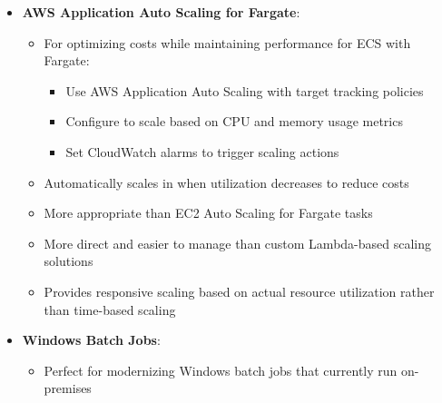 \documentclass[11pt,a4paper]{report}
\begin{document}
\begin{itemize}
\begin{itemize}
\begin{itemize}
\end{itemize}
  \item Provides serverless compute engine for containers that eliminates need to provision and manage servers
  \item Automatically scales application in response to changing demand without manual intervention
  \item Requires minimal code changes as containers can use the same images from on-premises environment
  \item Significantly reduces operational overhead compared to managing EC2 instances for container hosting
  \item More suitable than Lambda for containerized applications as it doesn't require application redesign
  \item Better than HPC solutions which are designed for compute-intensive workloads rather than web applications
  \item Creates a highly available, scalable architecture with minimal development effort and operational overhead
\end{itemize}
  \item \textbf{AWS Application Auto Scaling for Fargate}:
\begin{itemize}
  \item For optimizing costs while maintaining performance for ECS with Fargate:
\begin{itemize}
  \item Use AWS Application Auto Scaling with target tracking policies
  \item Configure to scale based on CPU and memory usage metrics
  \item Set CloudWatch alarms to trigger scaling actions
\end{itemize}
  \item Automatically scales in when utilization decreases to reduce costs
  \item More appropriate than EC2 Auto Scaling for Fargate tasks
  \item More direct and easier to manage than custom Lambda-based scaling solutions
  \item Provides responsive scaling based on actual resource utilization rather than time-based scaling
\end{itemize}
  \item \textbf{Windows Batch Jobs}:
\begin{itemize}
  \item Perfect for modernizing Windows batch jobs that currently run on-premises

\end{itemize}
\end{itemize}
\end{document}
